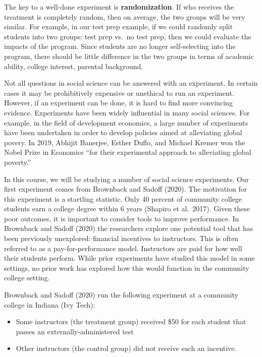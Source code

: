 \documentclass[
]{book}
\providecommand{\tightlist}{%
  \setlength{\itemsep}{0pt}\setlength{\parskip}{0pt}}
\begin{document}
The key to a well-done experiment is \textbf{randomization}. If who receives the treatment is completely random, then on average, the two groups will be very similar. For example, in our test prep example, if we could randomly split students into two groups: test prep vs.~no test prep, then we could evaluate the impacts of the program. Since students are no longer self-selecting into the program, there should be little difference in the two groups in terms of academic ability, college interest, parental background.

Not all questions in social science can be answered with an experiment. In certain cases it may be prohibitively expensive or unethical to run an experiment. However, if an experiment can be done, it is hard to find more convincing evidence. Experiments have been widely influential in many social sciences. For example, in the field of development economics, a large number of experiments have been undertaken in order to develop policies aimed at alleviating global povery. In 2019, Abhijit Banerjee, Esther Duflo, and Michael Kremer won the Nobel Prize in Economics ``for their experimental approach to alleviating global poverty.''

In this course, we will be studying a number of social science experiments. Our first experiment comes from Brownback and Sadoff (2020). The motivation for this experiment is a startling statistic. Only 40 percent of community college students earn a college degree within 6 years (Shapiro et al.~2017). Given these poor outcomes, it is important to consider tools to improve performance. In Brownback and Sadoff (2020) the researchers explore one potential tool that has been previously unexplored: financial incentives to instructors. This is often referred to as a pay-for-performance model. Instructors are paid for how well their students perform. While prior experiments have studied this model in some settings, no prior work has explored how this would function in the community college setting.

Brownback and Sadoff (2020) run the following experiment at a community college in Indiana (Ivy Tech):

\begin{itemize}
\tightlist
\item
  Some instructors (the treatment group) received \$50 for each student that passes an externally-administered test
\item
  Other instructors (the control group) did not receive such an incentive.
\end{itemize}
\end{document}

